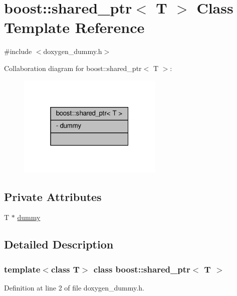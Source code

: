 \hypertarget{classboost_1_1shared__ptr}{}\section{boost\+:\+:shared\+\_\+ptr$<$ T $>$ Class Template Reference}
\label{classboost_1_1shared__ptr}


{\ttfamily \#include $<$doxygen\+\_\+dummy.\+h$>$}



Collaboration diagram for boost\+:\+:shared\+\_\+ptr$<$ T $>$\+:\nopagebreak
\begin{figure}[H]
\begin{center}
\leavevmode
\includegraphics[width=196pt]{classboost_1_1shared__ptr__coll__graph}
\end{center}
\end{figure}
\subsection*{Private Attributes}
\begin{DoxyCompactItemize}
\item 
T $\ast$ \hyperlink{classboost_1_1shared__ptr_a3416b29d5681db8a7f22d4106c2d175b}{dummy}
\end{DoxyCompactItemize}


\subsection{Detailed Description}
\subsubsection*{template$<$class T$>$\newline
class boost\+::shared\+\_\+ptr$<$ T $>$}



Definition at line 2 of file doxygen\+\_\+dummy.\+h.



